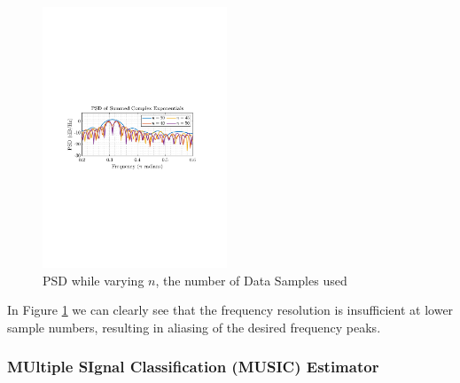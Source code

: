 \documentclass[12pt]{article}
\numberwithin{equation}{section}
\begin{document}
	\begin{figure}[H]%
		\centering
			\includegraphics[trim={2.2cm 11.2cm 3.15cm  11.2cm}, clip, width=0.49\textwidth]{../MATLAB/figures/q1_3d_fig01.pdf} 
	\captionsetup{justification=centering}
	\caption{PSD while varying $n$, the number of Data Samples used}
	\label{fig: 1-3d}
	\end{figure}
	
	In Figure \ref{fig: 1-3d} we can clearly see that the frequency resolution is insufficient at lower sample numbers, resulting in aliasing of the desired frequency peaks.
	
	\subsubsection{MUltiple SIgnal Classification (MUSIC) Estimator}
	
\end{document}
